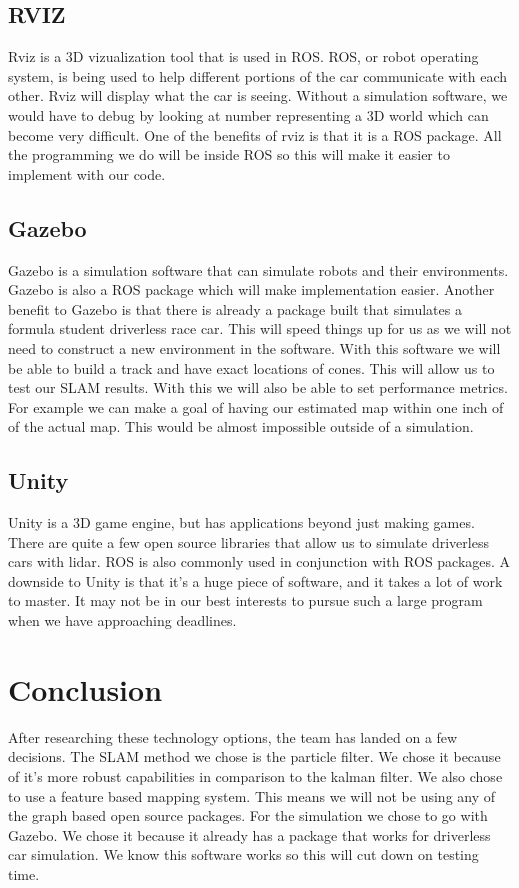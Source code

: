 \documentclass[10pt, onecolumn, draftclsnofoot, letterpaper,compsoc]{IEEEtran}
\begin{document}
\subsection{RVIZ}
Rviz is a 3D vizualization tool that is used in ROS. ROS, or robot operating system, is being used to help different portions of the car communicate with each other. Rviz will display what the car is seeing. Without a simulation software, we would have to debug by looking at number representing a 3D world which can become very difficult. One of the benefits of rviz is that it is a ROS package. All the programming we do will be inside ROS so this will make it easier to implement with our code.

\subsection{Gazebo}
Gazebo is a simulation software that can simulate robots and their environments. Gazebo is also a ROS package which will make implementation easier. Another benefit to Gazebo is that there is already a package built that simulates a formula student driverless race car. This will speed things up for us as we will not need to construct a new environment in the software. With this software we will be able to build a track and have exact locations of cones. This will allow us to test our SLAM results. With this we will also be able to set performance metrics. For example we can make a goal of having our estimated map within one inch of of the actual map. This would be almost impossible outside of a simulation.

\subsection{Unity}
Unity is a 3D game engine, but has applications beyond just making games. There are quite a few open source libraries that allow us to simulate driverless cars with lidar. ROS is also commonly used in conjunction with ROS packages. A downside to Unity is that it's a huge piece of software, and it takes a lot of work to master. It may not be in our best interests to pursue such a large program when we have approaching deadlines.

\section{Conclusion}
After researching these technology options, the team has landed on a few decisions. The SLAM method we chose is the particle filter. We chose it because of it's more robust capabilities in comparison to the kalman filter. We also chose to use a feature based mapping system. This means we will not be using any of the graph based open source packages. For the simulation we chose to go with Gazebo. We chose it because it already has a package that works for driverless car simulation. We know this software works so this will cut down on testing time.



\end{document}
